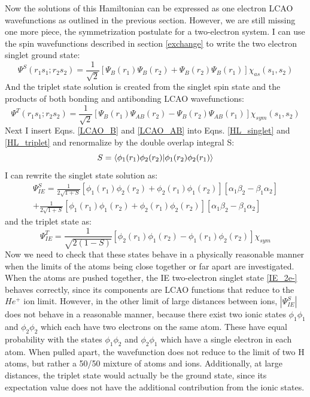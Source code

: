 Now the solutions of this Hamiltonian can be expressed as one electron LCAO wavefunctions as outlined in the previous section. However, we are still missing one more piece, the symmetrization postulate for a two-electron system. I can use the spin wavefunctions described in section \ref{exchange} to write the two electron singlet ground state:
\begin{equation}
\Psi^S(r_1 s_1;r_2 s_2)=\frac{1}{\sqrt{2}}[\Psi_B(r_1)\Psi_{B}(r_2)+\Psi_B(r_2)\Psi_B(r_1)]\chi_{as}(s_1,s_2)
\label{HL_singlet}
\end{equation}
And the triplet state solution is created from the singlet spin state and the products of both bonding and antibonding LCAO wavefunctions:
\begin{equation}
\Psi^T(r_1 s_1;r_2 s_2)=\frac{1}{\sqrt{2}}[\Psi_B(r_1)\Psi_{AB}(r_2)-\Psi_B(r_2)\Psi_{AB}(r_1)]\chi_{sym}(s_1,s_2)
\label{HL_triplet}
\end{equation}
Next I insert Eqns. \ref{LCAO_B} and \ref{LCAO_AB} into Eqns. \ref{HL_singlet} and \ref{HL_triplet} and renormalize by the double overlap integral S:
\begin{equation}
S = \braket{\phi_1(r_1)\phi_2(r_2)|\phi_1(r_2)\phi_2(r_1)}
\label{doubleoverint}
\end{equation}
I can rewrite the singlet state solution as:
\begin{equation}
\begin{split}
\Psi_{IE}^S=\frac{1}{2\sqrt{1+S}}[\phi_1(r_1)\phi_2(r_2)+\phi_2(r_1)\phi_1(r_2)][\alpha_1\beta_2-\beta_1\alpha_2] \\
+\frac{1}{2\sqrt{1+S}}[\phi_1(r_1)\phi_1(r_2)+\phi_2(r_1)\phi_2(r_2)][\alpha_1\beta_2-\beta_1\alpha_2]
\label{IE_2e-}
\end{split}
\end{equation}
and the triplet state as:
\begin{equation}
\Psi_{IE}^T=\frac{1}{\sqrt{2(1-S)}}[\phi_2(r_1)\phi_1(r_2)-\phi_1(r_1)\phi_2(r_2)]\chi_{sym}
\end{equation}
Now we need to check that these states behave in a physically reasonable manner when the limits of the atoms being close together or far apart are investigated. When the atoms are pushed together, the IE two-electron singlet state \ref{IE_2e-} behaves correctly, since its components are LCAO functions that reduce to the $He^+$ ion limit. However, in the other limit of large distances between ions, $|\Psi_{IE}^S|$ does not behave in a reasonable manner, because there exist two ionic states $\phi_1\phi_1$ and $\phi_2\phi_2$ which each have two electrons on the same atom. These have equal probability with the states $\phi_1\phi_2$ and $\phi_2\phi_1$ which have a single electron in each atom. When pulled apart, the wavefunction does not reduce to the limit of two H atoms, but rather a 50/50 mixture of atoms and ions. Additionally, at large distances, the triplet state would actually be the ground state, since its expectation value does not have the additional contribution from the ionic states. 

